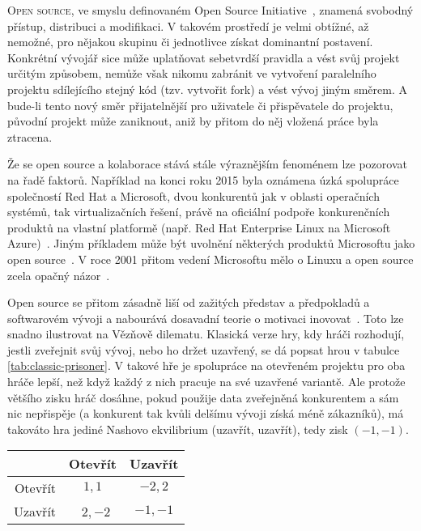 \hrulefill
\begin{multicols}{2}
\lettrine[nindent=0em,lines=3]{O}{pen source}, ve smyslu definovaném Open Source Initiative~\cite{OSI-2011}, znamená svobodný přístup, distribuci a modifikaci. V takovém prostředí je velmi obtížné, až nemožné, pro nějakou skupinu či jednotlivce získat dominantní postavení. Konkrétní vývojář sice může uplatňovat sebetvrdší pravidla a vést svůj projekt určitým způsobem, nemůže však nikomu zabránit ve vytvoření paralelního projektu sdílejícího stejný kód (tzv. vytvořit fork) a vést vývoj jiným směrem. A bude-li tento nový směr přijatelnější pro uživatele či přispěvatele do projektu, původní projekt může zaniknout, aniž by přitom do něj vložená práce byla ztracena.

Že se open source a kolaborace stává stále výraznějším fenoménem lze pozorovat na řadě faktorů. Například na konci roku 2015 byla oznámena úzká spolupráce společností Red Hat a Microsoft, dvou konkurentů jak v oblasti operačních systémů, tak virtualizačních řešení, právě na oficiální podpoře konkurenčních produktů na vlastní platformě (např. Red Hat Enterprise Linux na Microsoft Azure)~\cite{redhat-microsoft}. Jiným příkladem může být uvolnění některých produktů Microsoftu jako open source~\cite{dotnet-github}. V roce 2001 přitom vedení Microsoftu mělo o Linuxu a open source zcela opačný názor~\cite{ballmer-linux}.

Open source se přitom zásadně liší od zažitých představ a předpokladů a softwarovém vývoji a nabourává dosavadní teorie o motivaci inovovat~\cite{promise-of-research-opensource}. Toto lze snadno ilustrovat na Vězňově dilematu. Klasická verze hry, kdy hráči rozhodují, jestli zveřejnit svůj vývoj, nebo ho držet uzavřený, se dá popsat hrou v tabulce \ref{tab:classic-prisoner}. V takové hře je spolupráce na otevřeném projektu pro oba hráče lepší, než když každý z nich pracuje na své uzavřené variantě. Ale protože většího zisku hráč dosáhne, pokud použije data zveřejněná konkurentem a sám nic nepřispěje (a konkurent tak kvůli delšímu vývoji získá méně zákazníků), má takováto hra jediné Nashovo ekvilibrium (uzavřít, uzavřít), tedy zisk $(-1,-1)$.

\begin{Figure}
\begin{center}
\begin{tabular}{r| c c}
		& Otevřít & Uzavřít \\
		\hline
	Otevřít & $1,1$ & $-2,2$ \\
	Uzavřít & $2,-2$ &\cellcolor{gray!25}  $-1,-1$ \\
\end{tabular}
\end{center}
\label{tab:classic-prisoner}
\end{Figure}


\end{multicols}
